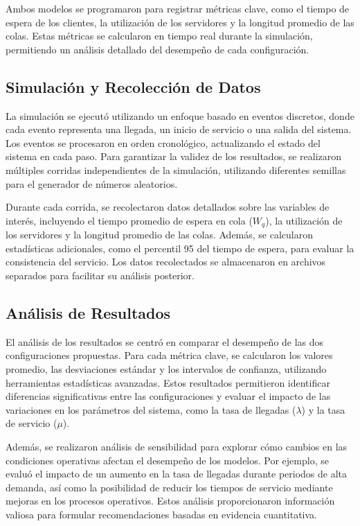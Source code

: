 \documentclass[a4paper,12pt]{article}
\begin{document}
Ambos modelos se programaron para registrar métricas clave, como el tiempo de espera de los clientes, la utilización de los servidores y la longitud promedio de las colas. Estas métricas se calcularon en tiempo real durante la simulación, permitiendo un análisis detallado del desempeño de cada configuración.

\subsection{Simulación y Recolección de Datos}

La simulación se ejecutó utilizando un enfoque basado en eventos discretos, donde cada evento representa una llegada, un inicio de servicio o una salida del sistema. Los eventos se procesaron en orden cronológico, actualizando el estado del sistema en cada paso. Para garantizar la validez de los resultados, se realizaron múltiples corridas independientes de la simulación, utilizando diferentes semillas para el generador de números aleatorios.

Durante cada corrida, se recolectaron datos detallados sobre las variables de interés, incluyendo el tiempo promedio de espera en cola ($W_q$), la utilización de los servidores y la longitud promedio de las colas. Además, se calcularon estadísticas adicionales, como el percentil 95 del tiempo de espera, para evaluar la consistencia del servicio. Los datos recolectados se almacenaron en archivos separados para facilitar su análisis posterior.

\subsection{Análisis de Resultados}

El análisis de los resultados se centró en comparar el desempeño de las dos configuraciones propuestas. Para cada métrica clave, se calcularon los valores promedio, las desviaciones estándar y los intervalos de confianza, utilizando herramientas estadísticas avanzadas. Estos resultados permitieron identificar diferencias significativas entre las configuraciones y evaluar el impacto de las variaciones en los parámetros del sistema, como la tasa de llegadas ($\lambda$) y la tasa de servicio ($\mu$).

Además, se realizaron análisis de sensibilidad para explorar cómo cambios en las condiciones operativas afectan el desempeño de los modelos. Por ejemplo, se evaluó el impacto de un aumento en la tasa de llegadas durante periodos de alta demanda, así como la posibilidad de reducir los tiempos de servicio mediante mejoras en los procesos operativos. Estos análisis proporcionaron información valiosa para formular recomendaciones basadas en evidencia cuantitativa.
\end{document}
